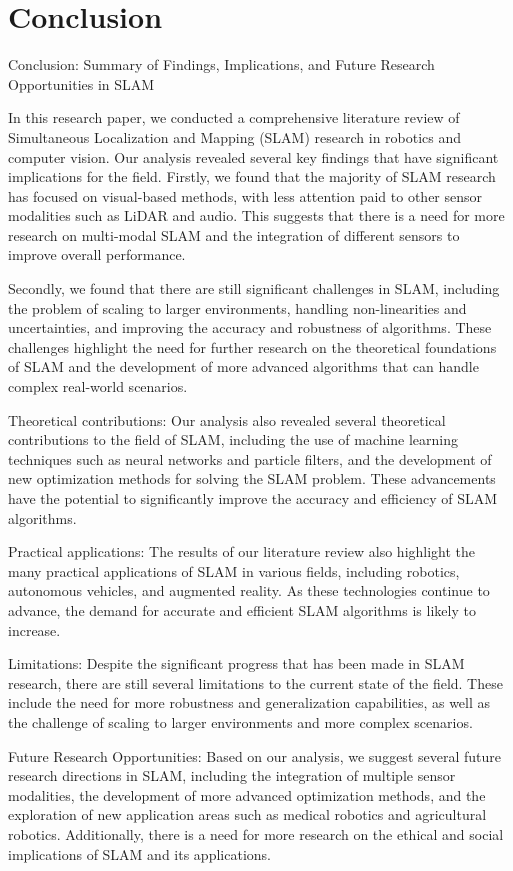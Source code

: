 \documentclass[conference]{IEEEtran}
\begin{document}
\section{Conclusion}
Conclusion: Summary of Findings, Implications, and Future Research Opportunities in SLAM

In this research paper, we conducted a comprehensive literature review of Simultaneous Localization and Mapping (SLAM) research in robotics and computer vision. Our analysis revealed several key findings that have significant implications for the field. Firstly, we found that the majority of SLAM research has focused on visual-based methods, with less attention paid to other sensor modalities such as LiDAR and audio. This suggests that there is a need for more research on multi-modal SLAM and the integration of different sensors to improve overall performance.

Secondly, we found that there are still significant challenges in SLAM, including the problem of scaling to larger environments, handling non-linearities and uncertainties, and improving the accuracy and robustness of algorithms. These challenges highlight the need for further research on the theoretical foundations of SLAM and the development of more advanced algorithms that can handle complex real-world scenarios.

Theoretical contributions: Our analysis also revealed several theoretical contributions to the field of SLAM, including the use of machine learning techniques such as neural networks and particle filters, and the development of new optimization methods for solving the SLAM problem. These advancements have the potential to significantly improve the accuracy and efficiency of SLAM algorithms.

Practical applications: The results of our literature review also highlight the many practical applications of SLAM in various fields, including robotics, autonomous vehicles, and augmented reality. As these technologies continue to advance, the demand for accurate and efficient SLAM algorithms is likely to increase.

Limitations: Despite the significant progress that has been made in SLAM research, there are still several limitations to the current state of the field. These include the need for more robustness and generalization capabilities, as well as the challenge of scaling to larger environments and more complex scenarios.

Future Research Opportunities: Based on our analysis, we suggest several future research directions in SLAM, including the integration of multiple sensor modalities, the development of more advanced optimization methods, and the exploration of new application areas such as medical robotics and agricultural robotics. Additionally, there is a need for more research on the ethical and social implications of SLAM and its applications.
\end{document}
